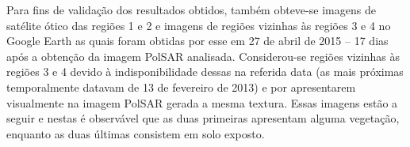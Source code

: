\documentclass[12pt]{article}
\begin{document}
Para fins de validação dos resultados obtidos, também obteve-se imagens de satélite ótico das regiões 1 e 2 e imagens de regiões vizinhas às regiões 3 e 4 no Google Earth as quais foram obtidas por esse em 27 de abril de 2015 -- 17 dias após a obtenção da imagem PolSAR analisada. Considerou-se regiões vizinhas às regiões 3 e 4 devido à indisponibilidade dessas na referida data (as mais próximas temporalmente datavam de 13 de fevereiro de 2013) e por apresentarem visualmente na imagem PolSAR gerada a mesma textura. Essas imagens estão a seguir e nestas é observável que as duas primeiras apresentam alguma vegetação, enquanto as duas últimas consistem em solo exposto.

\newpage
\begin{figure}[hbt]
    \centering
    \qquad
    \vspace{0.05\linewidth}

\end{figure}
\end{document}
